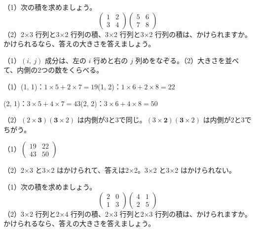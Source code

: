 \begin{reidai}
（1）次の積を求めましょう。
\[ \begin{pmatrix} 1 & 2\\ 3 & 4 \end{pmatrix}\begin{pmatrix} 5 & 6\\ 7 & 8 \end{pmatrix} \]
（2）2×3 行列と3×2 行列の積、3×2 行列と3×2 行列の積は、かけられますか。かけられるなら、答えの大きさを答えましょう。\par
\kangaekata （1）$(i,\ j)$ 成分は、左の $i$ 行めと右の $j$ 列めをなぞる。（2）大きさを並べて、内側の2つの数をくらべる。\par
\shiki\kviibs{}\zw{} （1）(1, 1)：$1\times5+2\times7=19$\qquad (1, 2)：$1\times6+2\times8=22$\par
\kviiba \phantom{（1）}(2, 1)：$3\times5+4\times7=43$\qquad (2, 2)：$3\times6+4\times8=50$\par
\kviiba （2）$(2\times\textbf{3})(\textbf{3}\times2)$ は内側が3と3で同じ。$(3\times\textbf{2})(\textbf{3}\times2)$ は内側が2と3でちがう。\par
\kotae\kviibs{}\zw{} （1）$\displaystyle\begin{pmatrix} 19 & 22\\ 43 & 50 \end{pmatrix}$\par
\kviiba （2）2×3 と3×2 はかけられて、答えは2×2。3×2 と3×2 はかけられない。
\end{reidai}

\begin{jibun}
（1）次の積を求めましょう。
\[ \begin{pmatrix} 2 & 0\\ 1 & 3 \end{pmatrix}\begin{pmatrix} 4 & 1\\ 2 & 5 \end{pmatrix} \]
（2）3×2 行列と2×4 行列の積、2×3 行列と2×3 行列の積は、かけられますか。かけられるなら、答えの大きさを答えましょう。
\end{jibun}

